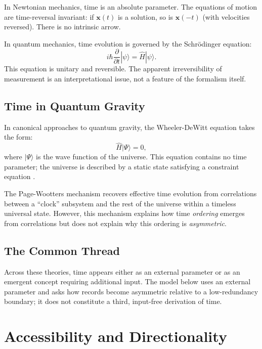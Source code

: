 \documentclass[12pt,a4paper,openany]{book}
\begin{document}
In Newtonian mechanics, time is an absolute parameter. The equations of motion are time-reversal invariant: if $\mathbf{x}(t)$ is a solution, so is $\mathbf{x}(-t)$ (with velocities reversed). There is no intrinsic arrow.

In quantum mechanics, time evolution is governed by the Schr\"odinger equation:
\begin{equation}
i\hbar \frac{\partial}{\partial t} |\psi\rangle = \hat{H} |\psi\rangle.
\end{equation}
This equation is unitary and reversible. The apparent irreversibility of measurement is an interpretational issue, not a feature of the formalism itself.

\subsection{Time in Quantum Gravity}

In canonical approaches to quantum gravity, the Wheeler-DeWitt equation takes the form:
\begin{equation}
\hat{H} |\Psi\rangle = 0,
\end{equation}
where $|\Psi\rangle$ is the wave function of the universe. This equation contains no time parameter; the universe is described by a static state satisfying a constraint equation \cite{DeWitt1967}.

The Page-Wootters mechanism \cite{PageWootters1983} recovers effective time evolution from correlations between a ``clock'' subsystem and the rest of the universe within a timeless universal state. However, this mechanism explains how time \emph{ordering} emerges from correlations but does not explain why this ordering is \emph{asymmetric}.

\subsection{The Common Thread}

Across these theories, time appears either as an external parameter or as an emergent concept requiring additional input.  The model below uses an external parameter and asks how records become asymmetric relative to a low-redundancy boundary; it does not constitute a third, input-free derivation of time.

\section{Accessibility and Directionality}
\label{H-F-sec:accessibility}
\end{document}
